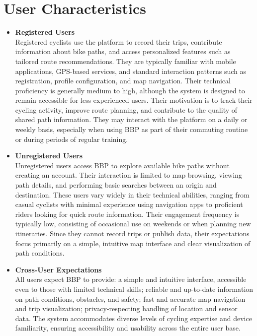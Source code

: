 \section{User Characteristics}
\begin{itemize}
The BBP platform is designed for two main categories of users, each with different goals, levels of interaction, and technical proficiency.
\item \textbf{Registered Users}\\
Registered cyclists use the platform to record their trips, contribute information about bike paths, and access personalized features such as tailored route recommendations. They are typically familiar with mobile applications, GPS-based services, and standard interaction patterns such as registration, profile configuration, and map navigation. Their technical proficiency is generally medium to high, although the system is designed to remain accessible for less experienced users. Their motivation is to track their cycling activity, improve route planning, and contribute to the quality of shared path information. They may interact with the platform on a daily or weekly basis, especially when using BBP as part of their commuting routine or during periods of regular training.

\item \textbf{Unregistered Users}\\
Unregistered users access BBP to explore available bike paths without creating an account. Their interaction is limited to map browsing, viewing path details, and performing basic searches between an origin and destination. These users vary widely in their technical abilities, ranging from casual cyclists with minimal experience using navigation apps to proficient riders looking for quick route information. Their engagement frequency is typically low, consisting of occasional use on weekends or when planning new itineraries. Since they cannot record trips or publish data, their expectations focus primarily on a simple, intuitive map interface and clear visualization of path conditions.

\item \textbf{Cross-User Expectations}\\
All users expect BBP to provide:
a simple and intuitive interface, accessible even to those with limited technical skills; reliable and up-to-date information on path conditions, obstacles, and safety; fast and accurate map navigation and trip visualization; privacy-respecting handling of location and sensor data. The system accommodates diverse levels of cycling expertise and device familiarity, ensuring accessibility and usability across the entire user base.

\end{itemize}





